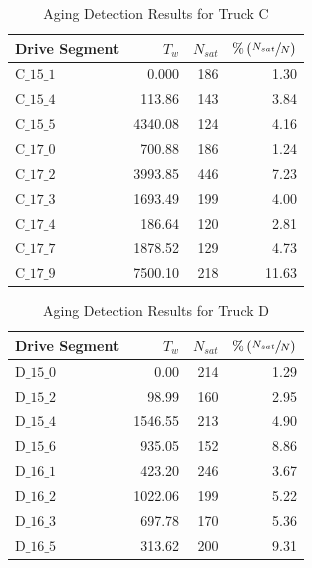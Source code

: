 \begin{table}[H]
        \centering
        \caption{Aging Detection Results for Truck C}
        \label{tab::wer_aging_res}
        \begin{tabular}{l r r r}
                \hline \hline
                Drive Segment & $T_w$   & $N_{sat}$ & $\% \left(  \sfrac{N_{sat}}{N}  \right)$ \\ \hline \hline
                C$\_15\_1$    & 0.000   & 186       & 1.30                           \\
                C$\_15\_4$    & 113.86  & 143       & 3.84                           \\
                C$\_15\_5$    & 4340.08 & 124       & 4.16                           \\ \hline
                C$\_17\_0$    & 700.88  & 186       & 1.24                           \\
                C$\_17\_2$    & 3993.85 & 446       & 7.23                           \\
                C$\_17\_3$    & 1693.49 & 199       & 4.00                           \\
                C$\_17\_4$    & 186.64  & 120       & 2.81                           \\
                C$\_17\_7$    & 1878.52 & 129       & 4.73                           \\
                C$\_17\_9$    & 7500.10 & 218       & 11.63                          \\
                \hline \hline
        \end{tabular}
\end{table}
\begin{table}[H]
        \centering
        \caption{Aging Detection Results for Truck D}
        \label{tab::trw_aging_res}
        \begin{tabular}{l r r r}
                \hline \hline
                Drive Segment & $T_w$   & $N_{sat}$ & $\% \left(  \sfrac{N_{sat}}{N}  \right)$ \\ \hline \hline
                D$\_15\_0$    & 0.00    & 214       & 1.29                           \\
                D$\_15\_2$    & 98.99   & 160       & 2.95                           \\
                D$\_15\_4$    & 1546.55 & 213       & 4.90                           \\
                D$\_15\_6$    & 935.05  & 152       & 8.86                           \\ \hline
                D$\_16\_1$    & 423.20  & 246       & 3.67                           \\
                D$\_16\_2$    & 1022.06 & 199       & 5.22                           \\
                D$\_16\_3$    & 697.78  & 170       & 5.36                           \\
                D$\_16\_5$    & 313.62  & 200       & 9.31                           \\
                \hline \hline
        \end{tabular}
\end{table}
